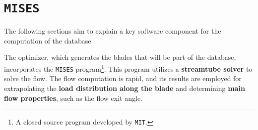 \chapter{\texttt{MISES}}







The following sections aim to explain a key software component for the computation of the database.

The optimizer, which generates the blades that will be part of the database, incorporates the \texttt{MISES} program\footnote{A closed source program developed by \texttt{MIT}.}. 
This program utilizes a \textbf{streamtube solver} to solve the flow. The flow computation is rapid, and its results are employed for extrapolating the \textbf{load distribution along the blade} and determining \textbf{main flow properties}, such as the flow exit angle.

